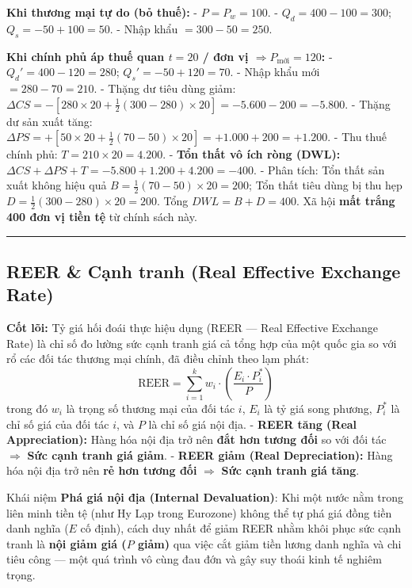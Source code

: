 \documentclass[
]{article}
\begin{document}
\textbf{Khi thương mại tự do (bỏ thuế):} - \(P = P_w = 100\). -
\(Q_d = 400 - 100 = 300\); \(Q_s = -50 + 100 = 50\). - Nhập khẩu
\(= 300 - 50 = 250\).

\textbf{Khi chính phủ áp thuế quan \(t = 20\) / đơn vị
\(\Rightarrow P_{\text{mới}} = 120\):} - \(Q_d' = 400 - 120 = 280\);
\(Q_s' = -50 + 120 = 70\). - Nhập khẩu mới \(= 280 - 70 = 210\). - Thặng
dư tiêu dùng giảm:
\(\Delta CS = -\left[280 \times 20 + \frac{1}{2}(300-280) \times 20\right] = -5.600 - 200 = -5.800\).
- Thặng dư sản xuất tăng:
\(\Delta PS = +\left[50 \times 20 + \frac{1}{2}(70-50) \times 20\right] = +1.000 + 200 = +1.200\).
- Thu thuế chính phủ: \(T = 210 \times 20 = 4.200\). - \textbf{Tổn thất
vô ích ròng (DWL):}
\(\Delta CS + \Delta PS + T = -5.800 + 1.200 + 4.200 = -400\). - Phân
tích: Tổn thất sản xuất không hiệu quả
\(B = \frac{1}{2}(70-50) \times 20 = 200\); Tổn thất tiêu dùng bị thu
hẹp \(D = \frac{1}{2}(300-280) \times 20 = 200\). Tổng
\(DWL = B + D = 400\). Xã hội \textbf{mất trắng 400 đơn vị tiền tệ} từ
chính sách này.

\begin{center}\rule{0.5\linewidth}{0.5pt}\end{center}

\subsection{REER \& Cạnh tranh (Real Effective Exchange
Rate)}\label{reer-cux1ea1nh-tranh-real-effective-exchange-rate}

\textbf{Cốt lõi:} Tỷ giá hối đoái thực hiệu dụng (REER --- Real
Effective Exchange Rate) là chỉ số đo lường sức cạnh tranh giá cả tổng
hợp của một quốc gia so với rổ các đối tác thương mại chính, đã điều
chỉnh theo lạm phát:
\[ \text{REER} = \sum_{i=1}^{k} w_i \cdot \left( \frac{E_i \cdot P^*_i}{P} \right) \]
trong đó \(w_i\) là trọng số thương mại của đối tác \(i\), \(E_i\) là tỷ
giá song phương, \(P^*_i\) là chỉ số giá của đối tác \(i\), và \(P\) là
chỉ số giá nội địa. - \textbf{REER tăng (Real Appreciation):} Hàng hóa
nội địa trở nên \textbf{đắt hơn tương đối} so với đối tác
\(\Rightarrow\) \textbf{Sức cạnh tranh giá giảm}. - \textbf{REER giảm
(Real Depreciation):} Hàng hóa nội địa trở nên \textbf{rẻ hơn tương đối}
\(\Rightarrow\) \textbf{Sức cạnh tranh giá tăng}.

Khái niệm \textbf{Phá giá nội địa (Internal Devaluation)}: Khi một nước
nằm trong liên minh tiền tệ (như Hy Lạp trong Eurozone) không thể tự phá
giá đồng tiền danh nghĩa (\(E\) cố định), cách duy nhất để giảm REER
nhằm khôi phục sức cạnh tranh là \textbf{nội giảm giá (\(P\) giảm)} qua
việc cắt giảm tiền lương danh nghĩa và chi tiêu công --- một quá trình
vô cùng đau đớn và gây suy thoái kinh tế nghiêm trọng.
\end{document}
